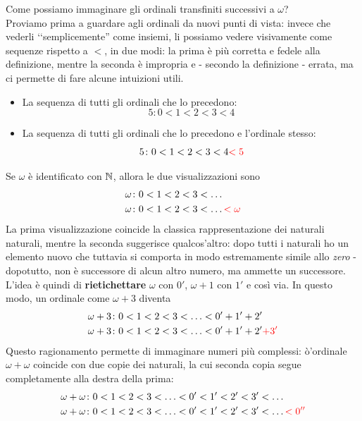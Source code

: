 \begin{intuit}\label{visualizzazioneordinali}
	Come possiamo immaginare gli ordinali transfiniti successivi a $\omega$?\\
	Proviamo prima a guardare agli ordinali da nuovi punti di vista: invece che vederli ‘‘semplicemente'' come insiemi, li possiamo vedere visivamente come sequenze rispetto a $<$, in due modi: la prima è più corretta e fedele alla definizione, mentre la seconda è impropria e - secondo la definizione - errata, ma ci permette di fare alcune intuizioni utili.
	\begin{itemize}
		\item La sequenza di tutti gli ordinali che lo precedono:
		\begin{equation*}
			5\colon 0<1<2<3<4
		\end{equation*}
		\item La sequenza di tutti gli ordinali che lo precedono e l'ordinale stesso:
		\begin{equation*}
			5\colon 0<1<2<3<4\textcolor{red}{<5}
		\end{equation*}
	\end{itemize}
Se $\omega$ è identificato con $\mathbb{N}$, allora le due visualizzazioni sono
	\begin{align*}
		\omega&\colon0<1<2<3<\ldots\\
		\omega&\colon0<1<2<3<\ldots\textcolor{red}{<\omega}
	\end{align*}
La prima visualizzazione coincide la classica rappresentazione dei naturali naturali, mentre la seconda suggerisce qualcos'altro: dopo tutti i naturali ho un elemento nuovo che tuttavia si comporta in modo estremamente simile allo \textit{zero} - dopotutto, non è successore di alcun altro numero, ma ammette un successore.\\
L'idea è quindi di \textbf{rietichettare} $\omega$ con $0'$, $\omega+1$ con $1'$ e così via. In questo modo, un ordinale come $\omega+3$ diventa 
\begin{align*}
	\omega+3&\colon0<1<2<3<\ldots<0'+1'+2'\\
	\omega+3&\colon0<1<2<3<\ldots<0'+1'+2'\textcolor{red}{+3'}
\end{align*}
Questo ragionamento permette di immaginare numeri più complessi: ò'ordinale $\omega+\omega$ coincide con due copie dei naturali, la cui seconda copia segue completamente alla destra della prima:
\begin{align*}
	\omega+\omega&\colon0<1<2<3<\ldots<0'<1'<2'<3'<\ldots\\
	\omega+\omega&\colon0<1<2<3<\ldots<0'<1'<2'<3'<\ldots\textcolor{red}{<0''}
\end{align*}
\end{intuit}

